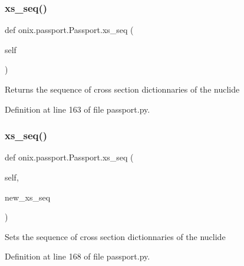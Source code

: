 \mbox{\label{classonix_1_1passport_1_1Passport_a9cf8684ae2a1c0756b19a3bc13c679d1}} 
\subsubsection{\texorpdfstring{xs\+\_\+seq()}{xs\_seq()}\hspace{0.1cm}{\footnotesize\ttfamily [1/2]}}
{\footnotesize\ttfamily def onix.\+passport.\+Passport.\+xs\+\_\+seq (\begin{DoxyParamCaption}\item[{}]{self }\end{DoxyParamCaption})}

\begin{DoxyVerb}Returns the sequence of cross section dictionnaries of the nuclide\end{DoxyVerb}
 

Definition at line 163 of file passport.\+py.

\mbox{\label{classonix_1_1passport_1_1Passport_a14234e2569402104268dcfd9b0db6f20}} 
\subsubsection{\texorpdfstring{xs\+\_\+seq()}{xs\_seq()}\hspace{0.1cm}{\footnotesize\ttfamily [2/2]}}
{\footnotesize\ttfamily def onix.\+passport.\+Passport.\+xs\+\_\+seq (\begin{DoxyParamCaption}\item[{}]{self,  }\item[{}]{new\+\_\+xs\+\_\+seq }\end{DoxyParamCaption})}

\begin{DoxyVerb}Sets the sequence of cross section dictionnaries of the nuclide\end{DoxyVerb}
 

Definition at line 168 of file passport.\+py.

